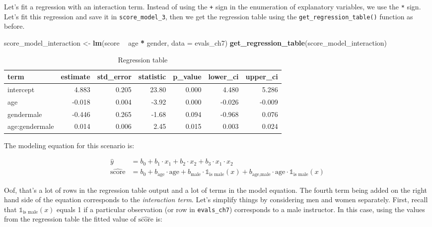 \documentclass[12pt,]{krantz}
\makeatletter
\newenvironment{Shaded}{\begin{snugshade}}{\end{snugshade}}
\newcommand{\KeywordTok}[1]{\textcolor[rgb]{0.27,0.27,0.27}{\textbf{#1}}}
\newcommand{\DataTypeTok}[1]{\textcolor[rgb]{0.27,0.27,0.27}{#1}}
\newcommand{\StringTok}[1]{\textcolor[rgb]{0.5,0.5,0.5}{#1}}
\newcommand{\OperatorTok}[1]{\textcolor[rgb]{0.43,0.43,0.43}{\textbf{#1}}}
\newcommand{\NormalTok}[1]{#1}
\newenvironment{kframe}{%
\medskip{}
\setlength{\fboxsep}{.8em}
 \def\at@end@of@kframe{}%
 \ifinner\ifhmode%
  \def\at@end@of@kframe{\end{minipage}}%
  \begin{minipage}{\columnwidth}%
 \fi\fi%
 \def\FrameCommand##1{\hskip\@totalleftmargin \hskip-\fboxsep
 \colorbox{shadecolor}{##1}\hskip-\fboxsep
     \hskip-\linewidth \hskip-\@totalleftmargin \hskip\columnwidth}%
 \MakeFramed {\advance\hsize-\width
   \@totalleftmargin\z@ \linewidth\hsize
   \@setminipage}}%
 {\par\unskip\endMakeFramed%
 \at@end@of@kframe}
\renewenvironment{Shaded}{\begin{kframe}}{\end{kframe}}
\theoremstyle{definition}
\theoremstyle{definition}
\theoremstyle{definition}
\theoremstyle{remark}
\makeatother
\begin{document}
Let's fit a regression with an interaction term. Instead of using the
\texttt{+} sign in the enumeration of explanatory variables, we use the
\texttt{*} sign. Let's fit this regression and save it in
\texttt{score\_model\_3}, then we get the regression table using the
\texttt{get\_regression\_table()} function as before.

\begin{Shaded}
\begin{Highlighting}[]
\NormalTok{score_model_interaction <-}\StringTok{ }\KeywordTok{lm}\NormalTok{(score }\OperatorTok{~}\StringTok{ }\NormalTok{age }\OperatorTok{*}\StringTok{ }\NormalTok{gender, }\DataTypeTok{data =}\NormalTok{ evals_ch7)}
\KeywordTok{get_regression_table}\NormalTok{(score_model_interaction)}
\end{Highlighting}
\end{Shaded}

\begin{table}[H]

\caption{\label{tab:unnamed-chunk-248}Regression table}
\centering
\fontsize{10}{12}\selectfont
\begin{tabular}[t]{lrrrrrr}
\toprule
term & estimate & std\_error & statistic & p\_value & lower\_ci & upper\_ci\\
\midrule
intercept & 4.883 & 0.205 & 23.80 & 0.000 & 4.480 & 5.286\\
age & -0.018 & 0.004 & -3.92 & 0.000 & -0.026 & -0.009\\
gendermale & -0.446 & 0.265 & -1.68 & 0.094 & -0.968 & 0.076\\
age:gendermale & 0.014 & 0.006 & 2.45 & 0.015 & 0.003 & 0.024\\
\bottomrule
\end{tabular}
\end{table}

The modeling equation for this scenario is:

\begin{align}
\widehat{y} &= b_0 + b_1 \cdot x_1 + b_2 \cdot x_2 + b_3 \cdot x_1 \cdot x_2\\
\widehat{\mbox{score}} &= b_0 + b_{\mbox{age}} \cdot \mbox{age} + b_{\mbox{male}} \cdot \mathbb{1}_{\mbox{is male}}(x) + b_{\mbox{age,male}} \cdot \mbox{age} \cdot \mathbb{1}_{\mbox{is male}}(x)
\end{align}

Oof, that's a lot of rows in the regression table output and a lot of
terms in the model equation. The fourth term being added on the right
hand side of the equation corresponds to the \emph{interaction term}.
Let's simplify things by considering men and women separately. First,
recall that \(\mathbb{1}_{\mbox{is male}}(x)\) equals 1 if a particular
observation (or row in \texttt{evals\_ch7}) corresponds to a male
instructor. In this case, using the values from the regression table the
fitted value of \(\widehat{\mbox{score}}\) is:
\end{document}
